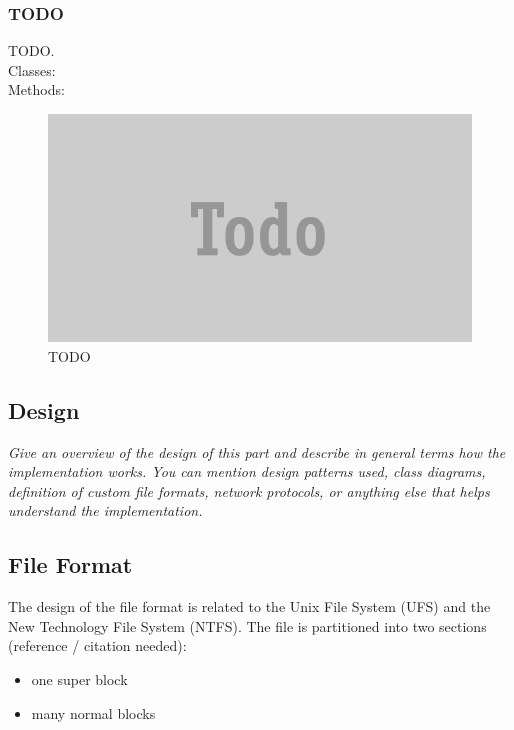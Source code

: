 \documentclass[JCDReport.tex]{subfiles}
\begin{document}
\subsubsection{TODO}
TODO.\\
Classes:\\
Methods:\\
\begin{figure}[h!]
	\centering
	\includegraphics[scale=1]{Images/todo.png} 
	\caption{TODO}
\end{figure}




\subsection{Design}

\emph{Give an overview of the design of this part and describe in general terms how the implementation works. You can mention design patterns used, class diagrams, definition of custom file formats, network protocols, or anything else that helps understand the implementation.}

\subsection{File Format}

The design of the file format is related to the Unix File System (UFS) and the New Technology File System (NTFS). The file is partitioned into two sections (reference / citation needed):

\begin{itemize}
  \item one super block
  \item many normal blocks
\end{itemize}
\end{document}
